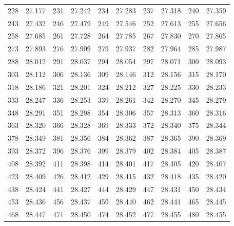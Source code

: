 \documentclass[12pt]{ctexart}
\numberwithin{equation}{section}
\begin{document}
\begin{longtable}{cc|cc|cc|cc|cc}
    228      & 27.177   & 231      & 27.242   & 234      & 27.283   & 237      & 27.318   & 240      & 27.359   \\
    243      & 27.432   & 246      & 27.479   & 249      & 27.546   & 252      & 27.613   & 255      & 27.656   \\
    258      & 27.685   & 261      & 27.728   & 264      & 27.785   & 267      & 27.830   & 270      & 27.865   \\
    273      & 27.893   & 276      & 27.909   & 279      & 27.937   & 282      & 27.964   & 285      & 27.987   \\
    288      & 28.012   & 291      & 28.037   & 294      & 28.054   & 297      & 28.071   & 300      & 28.093   \\
    303      & 28.112   & 306      & 28.136   & 309      & 28.146   & 312      & 28.156   & 315      & 28.170   \\
    318      & 28.186   & 321      & 28.201   & 324      & 28.212   & 327      & 28.225   & 330      & 28.233   \\
    333      & 28.247   & 336      & 28.253   & 339      & 28.261   & 342      & 28.270   & 345      & 28.279   \\
    348      & 28.291   & 351      & 28.298   & 354      & 28.306   & 357      & 28.313   & 360      & 28.316   \\
    363      & 28.320   & 366      & 28.328   & 369      & 28.333   & 372      & 28.340   & 375      & 28.344   \\
    378      & 28.349   & 381      & 28.356   & 384      & 28.362   & 387      & 28.365   & 390      & 28.369   \\
    393      & 28.372   & 396      & 28.376   & 399      & 28.379   & 402      & 28.384   & 405      & 28.387   \\
    408      & 28.392   & 411      & 28.398   & 414      & 28.401   & 417      & 28.405   & 420      & 28.407   \\
    423      & 28.409   & 426      & 28.412   & 429      & 28.415   & 432      & 28.418   & 435      & 28.420   \\
    438      & 28.424   & 441      & 28.427   & 444      & 28.429   & 447      & 28.431   & 450      & 28.434   \\
    453      & 28.436   & 456      & 28.437   & 459      & 28.440   & 462      & 28.441   & 465      & 28.445   \\
    468      & 28.447   & 471      & 28.450   & 474      & 28.452   & 477      & 28.455   & 480      & 28.455   \\

\end{longtable}
\end{document}

